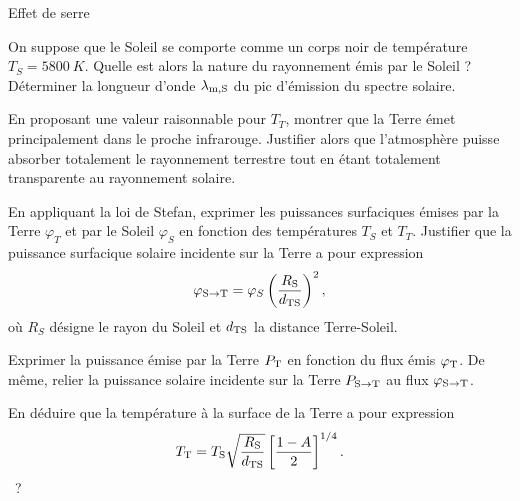 \begin{exo}[PC][1][devoir]{Effet de serre}
\begin{quest}
  \item On suppose que le Soleil se comporte comme un corps noir de température $T_S = \SI{5800}{K}$. Quelle est alors la nature du rayonnement émis par le Soleil ? Déterminer la longueur d'onde $\lambda_{\rm m,S}$ du pic d'émission du spectre solaire.
  
  \item En proposant une valeur raisonnable pour $T_T$, montrer que la Terre émet principalement dans le proche infrarouge. Justifier alors que l'atmosphère puisse absorber totalement le rayonnement terrestre tout en étant totalement transparente au rayonnement solaire.
  \item En appliquant la loi de Stefan, exprimer les puissances surfaciques émises par la Terre $\varphi_T$ et par le Soleil $\varphi_S$ en fonction des températures $T_S$ et $T_T$. Justifier que la puissance surfacique solaire incidente sur la Terre a pour expression
  \begin{equation}
  \varphi_{\rm{S}\to\rm{T}} = \varphi_S \left(\frac{R_{\rm{S}}}{d_{\rm{TS}}}\right)^2,
  \end{equation}
  où $R_S$ désigne le rayon du Soleil et  $d_{\rm{TS}}$ la distance Terre-Soleil.
  \item Exprimer la puissance émise par la Terre $P_{\rm T}$ en fonction du flux émis $\varphi_{\rm T}$. De même, relier la puissance solaire incidente sur la Terre $P_{\rm  S \rightarrow T}$ au flux $\varphi_{\rm{S}\to\rm{T}}$.
  
  
  
  \item En déduire que la température à la surface de la Terre a pour expression
  \begin{equation}
  T_{\rm{T}}=T_{\rm{S}}  \sqrt{\frac{R_{\rm{S}}}{d_{\rm{TS}}}} \left[\frac{1-A}{2}\right]^{1/4}.
  \end{equation}
  \AN~?
  \end{quest}
  
  \end{exo}
